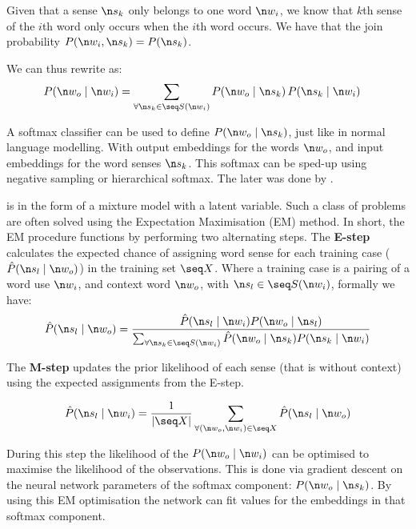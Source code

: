 {Given that a sense $\n s_k$ only belongs to one word $\n w_i$,
we know that $k$th sense of the $i$th word only occurs when the $i$th word occurs.
We have that the join probability $P(\n w_i,\n s_k) = P(\n s_k)$.

We can thus rewrite  as:
\begin{align}
P(\n w_o\mid \n w_i) &= \sum_{\forall \n s_k \in \seq S(\n w_i)} P(\n w_o \mid \n s_k) \, P(\n s_k \mid \n w_i) \label{equ:tianmm2}
\end{align}

A softmax classifier can be used to define $P(\n w_o \mid \n s_k)$, just like in normal language modelling.
With output embeddings for the words $\n w_o$, and input embeddings for the word senses $\n s_k$.
This softmax can be sped-up using negative sampling or hierarchical softmax.
The later was done by \textcite{tian2014probabilistic}.

 is in the form of a mixture model with a latent variable.
Such a class of problems are often solved using the Expectation Maximisation (EM) method.
In short, the EM procedure functions by performing two alternating steps.
The \textbf{E-step} calculates the expected chance of assigning word sense for each training case ($\hat{P}(\n s_l \mid \n w_o)$) in the training set $\seq X$.
Where a training case is a pairing of a word use $\n w_i$, and context word $\n w_o$, with $\n s_l\in \seq S(\n w_i)$, formally we have:
\begin{align}
\hat{P}(\n s_l \mid \n w_o) = \frac{\hat{P}(\n s_l \mid \n w_i) P(\n w_o \mid \n s_l)}{\sum_{\forall \n s_k \in \seq S(\n w_i)} \hat{P}(\n w_o \mid \n s_k) P(\n s_k \mid \n w_i)}
\end{align}

The \textbf{M-step} updates the prior likelihood of each sense (that is without context) using the expected assignments from the E-step.

\begin{align}
\hat{P}(\n s_l \mid \n w_i) = \frac{1}{\left|\seq X\right|} \sum_{\forall (\n w_o,\n w_i)\in \seq X} \hat{P}(\n s_l \mid \n w_o)
\end{align}

During this step the likelihood of the $P(\n w_o \mid \n w_i)$ can be optimised to maximise the likelihood of the observations.
This is done via gradient descent on the neural network parameters of the softmax component: \mbox{$P(\n w_o \mid \n s_k)$}.
By using this EM optimisation the network can fit values for the embeddings in that softmax component.


}
